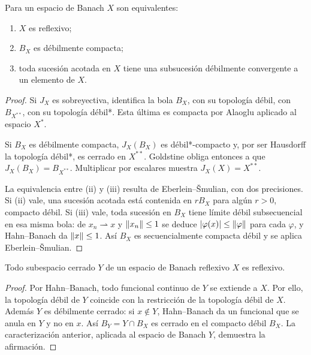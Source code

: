 \begin{teorema}\label{v3:reflexividad-bola}
Para un espacio de Banach $X$ son equivalentes:
\begin{enumerate}
\item $X$ es reflexivo;
\item $B_X$ es débilmente compacta;
\item toda sucesión acotada en $X$ tiene una subsucesión débilmente convergente a un elemento de $X$.
\end{enumerate}
\end{teorema}
\begin{proof}
Si $J_X$ es sobreyectiva, identifica la bola $B_X$, con su topología débil, con $B_{X^{**}}$, con su topología débil*. Esta última es compacta por Alaoglu aplicado al espacio $X^*$.

Si $B_X$ es débilmente compacta, $J_X(B_X)$ es débil*-compacto y, por ser Hausdorff la topología débil*, es cerrado en $X^{**}$. Goldstine obliga entonces a que $J_X(B_X)=B_{X^{**}}$. Multiplicar por escalares muestra $J_X(X)=X^{**}$.

La equivalencia entre (ii) y (iii) resulta de Eberlein--Šmulian, con dos precisiones. Si (ii) vale, una sucesión acotada está contenida en $rB_X$ para algún $r>0$, compacto débil. Si (iii) vale, toda sucesión en $B_X$ tiene límite débil subsecuencial en esa misma bola: de $x_n\rightharpoonup x$ y $\left\lVert x_n\right\rVert\leq1$ se deduce $|\varphi(x)|\leq\left\lVert\varphi\right\rVert$ para cada $\varphi$, y Hahn--Banach da $\left\lVert x\right\rVert\leq1$. Así $B_X$ es secuencialmente compacta débil y se aplica Eberlein--Šmulian.
\end{proof}

\begin{proposicion}\label{v3:subespacio-reflexivo}
Todo subespacio cerrado $Y$ de un espacio de Banach reflexivo $X$ es reflexivo.
\end{proposicion}
\begin{proof}
Por Hahn--Banach, todo funcional continuo de $Y$ se extiende a $X$. Por ello, la topología débil de $Y$ coincide con la restricción de la topología débil de $X$. Además $Y$ es débilmente cerrado: si $x\notin Y$, Hahn--Banach da un funcional que se anula en $Y$ y no en $x$. Así $B_Y=Y\cap B_X$ es cerrado en el compacto débil $B_X$. La caracterización anterior, aplicada al espacio de Banach $Y$, demuestra la afirmación.
\end{proof}

